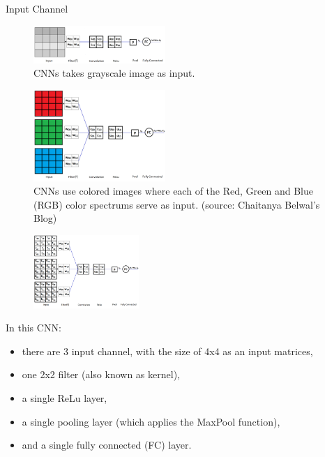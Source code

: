 \begin{vbframe}{Input Channel}
 \begin{figure}
    \centering
    \includegraphics[width=5cm]{plots/05_conv_variations/channels/1channel.png}
    \caption{\tiny CNNs takes grayscale image as input.}
  \end{figure}


 \begin{figure}
    \centering
    \includegraphics[width=5cm]{plots/05_conv_variations/channels/3channel.png}
    \caption{\tiny CNNs use colored images where each of the Red, Green and Blue (RGB) color spectrums serve as input. (source: Chaitanya Belwal's Blog)}
  \end{figure}

 \begin{figure}
    \centering
    \includegraphics[width=4cm]{plots/05_conv_variations/channels/cnn-net.png}
  \end{figure}

In this CNN:
    \begin{itemize}
       \item there are 3 input channel, with the size of 4x4 as an input matrices, 
       \item one 2x2 filter (also known as kernel), 
       \item a single ReLu layer,
       \item a single pooling layer (which applies the MaxPool function),
       \item and a single fully connected (FC) layer.
    \end{itemize}


\end{vbframe}
